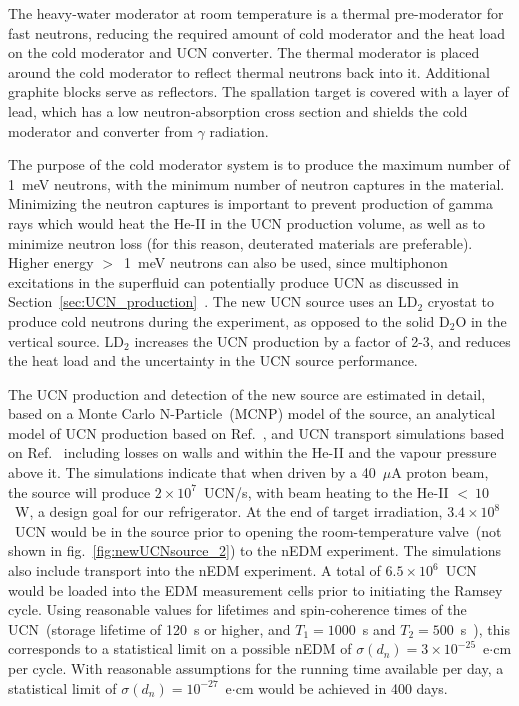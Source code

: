 The heavy-water moderator at room temperature is a thermal
pre-moderator for fast neutrons, reducing the required amount of cold
moderator and the heat load on the cold moderator and UCN
converter. The thermal moderator is placed around the cold moderator
to reflect thermal neutrons back into it. Additional graphite blocks
serve as reflectors. The spallation target is covered with a layer of
lead, which has a low neutron-absorption cross section and shields the
cold moderator and converter from $\gamma$ radiation.

The purpose of the cold moderator system is to produce the maximum
number of 1~meV neutrons, with the minimum number of neutron captures
in the material. Minimizing the neutron captures is important to
prevent production of gamma rays which would heat the He-II in the UCN
production volume, as well as to minimize neutron loss (for this
reason, deuterated materials are preferable). Higher energy $>$~1~meV
neutrons can also be used, since multiphonon excitations in the
superfluid can potentially produce UCN as discussed in
Section~\ref{sec:UCN_production}~\cite{Schmidt2009,
  Korobkina2002}. The new UCN source uses an LD$_2$ cryostat to
produce cold neutrons during the experiment, as opposed to the solid
D$_2$O in the vertical source. LD$_2$ increases the UCN production by
a factor of 2-3, and reduces the heat load and the uncertainty in the
UCN source performance.



The UCN production and detection of the new source are estimated in
detail, based on a Monte Carlo N-Particle~(MCNP) model of the source,
an analytical model of UCN production based on
Ref.~\cite{Korobkina2002}, and UCN transport simulations based on
Ref.~\cite{schreyer2017pentrack} including losses on walls and within
the He-II and the vapour pressure above it.  The simulations indicate
that when driven by a 40~$\mu$A proton beam, the source will produce
$2\times 10^7$~UCN/s, with beam heating to the He-II $<~10$~W, a
design goal for our refrigerator. At the end of target irradiation,
$3.4\times 10^8$~UCN would be in the source prior to opening the
room-temperature valve~(not shown in fig.~\ref{fig:newUCNsource_2}) to
the nEDM experiment.  The simulations also include transport into the
nEDM experiment. A total of $6.5 \times 10^6$~UCN would be loaded into
the EDM measurement cells prior to initiating the Ramsey cycle. Using
reasonable values for lifetimes and spin-coherence times of the
UCN~(storage lifetime of 120~s or higher, and $T_1 = 1000$~s and
$T_2 = 500$~s~\cite{cdr2018}), this corresponds to a statistical limit
on a possible nEDM of $\sigma(d_n) = 3\times 10^{-25}$~e$\cdot$cm per
cycle. With reasonable assumptions for the running time available per
day, a statistical limit of $\sigma(d_n) = 10^{-27}$~e$\cdot$cm would
be achieved in 400 days.


